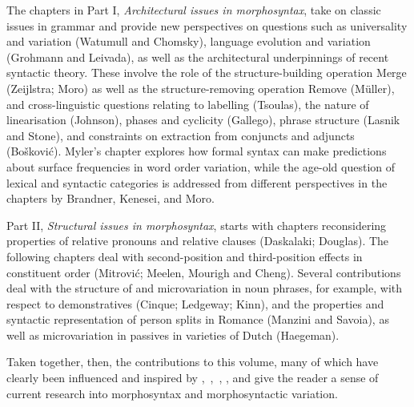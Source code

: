 \documentclass[output=paper]{langsci/langscibook}
\begin{document}
The chapters in Part I, \emph{Architectural issues in morphosyntax}, take on
classic issues in grammar and provide new perspectives on questions such as
universality and variation (Watumull and Chomsky), language evolution and
variation (Grohmann and Leivada), as well as the architectural underpinnings of
recent syntactic theory. These involve the role of the structure-building
operation Merge (Zeijlstra; Moro) as well as the structure-removing operation
Remove (Müller), and cross-linguistic questions relating to labelling
(Tsoulas), the nature of linearisation (Johnson), phases and cyclicity
(Gallego), phrase structure (Lasnik and Stone), and constraints on extraction
from conjuncts and adjuncts (Bošković). Myler’s chapter explores how formal
syntax can make predictions about surface frequencies in word order variation,
while the age-old question of lexical and syntactic categories is addressed
from different perspectives in the chapters by Brandner, Kenesei, and Moro.

Part II, \emph{Structural issues in morphosyntax}, starts with chapters
reconsidering properties of relative pronouns and relative clauses (Daskalaki;
Douglas). The following chapters deal with second-position and third-position
effects in constituent order (Mitrović; Meelen, Mourigh and Cheng). Several
contributions deal with the structure of and microvariation in noun phrases,
for example, with respect to demonstratives (Cinque; Ledgeway; Kinn), and the
properties and syntactic representation of person splits in Romance (Manzini
and Savoia), as well as microvariation in passives in varieties of Dutch
(Haegeman).

Taken together, then, the contributions to this volume, many of which have
clearly been influenced and inspired by
\textcite{Roberts2010,Roberts2012},~\textcite{RobRou2003},~\textcite{RobHol2010},
\textcite{BibRob2012,BibRob2015}, and \textcite{BibHolRob2014} give the reader
a sense of current research into morphosyntax and morphosyntactic variation.

{\sloppy
    \printbibliography[heading=subbibliography,notkeyword=this]
}
\end{document}
